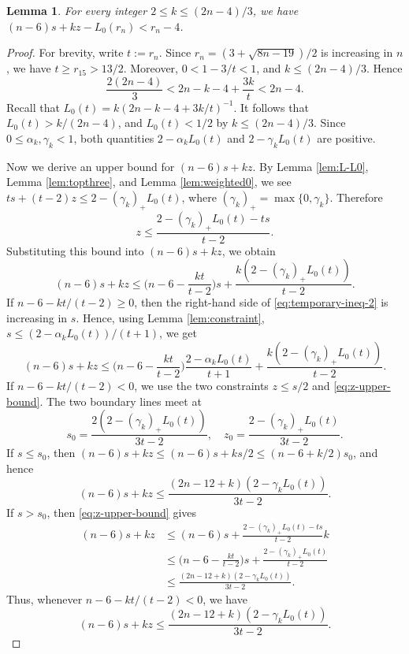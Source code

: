 \documentclass[11pt]{article}
\theoremstyle{plain}
\newtheorem{lemma}{Lemma}[section]
\theoremstyle{definition}
\numberwithin{equation}{section}
\begin{document}
\begin{lemma}\label{lem:normalized-first}
For every integer $2\leq k\le(2n-4)/3$, 
we have $(n-6)s + kz - L_0(r_n) < r_n - 4$.
\end{lemma}

\begin{proof}
For brevity, write $t := r_n$. Since
$r_n=(3+\sqrt{8n-19})/2$ is increasing in $n$, we have $t\geq r_{15} > 13/2$.
Moreover, $0<1-3/t<1$, and $k\leq (2n-4)/3$. Hence
\[
 \frac{2(2n-4)}3 < 2n-k-4+\frac{3k}{t} < 2n-4.
\]
Recall that $L_0(t) = k(2n - k - 4 + 3k/t)^{-1}$. It follows that
$L_0(t) > k/(2n-4)$, and $L_0(t) < 1/2$ by $k\leq (2n-4)/3$.
Since $0\leq\alpha_k, \gamma_k<1$, both quantities
$2-\alpha_kL_0(t)$ and $2-\gamma_kL_0(t)$ are positive.

Now we derive an upper bound for $(n-6)s + kz$. By Lemma \ref{lem:L-L0}, Lemma \ref{lem:topthree}, 
and Lemma \ref{lem:weighted0}, we see $ts + (t-2)z\leq 2 - (\gamma_k)_+ L_0(t)$, 
where $(\gamma_k)_+ = \max\{0, \gamma_k\}$. Therefore
\begin{equation}\label{eq:z-upper-bound}
 z\leq\frac{2 - (\gamma_k)_+ L_0(t) - ts}{t - 2}.
\end{equation}
Substituting this bound into $(n-6)s+kz$, we obtain
\begin{equation}\label{eq:temporary-ineq-2}
(n - 6) s + kz
\leq \Big(n - 6 - \frac{kt}{t-2}\Big)s + \frac{k(2 - (\gamma_k)_+ L_0(t))}{t - 2}.
\end{equation}
If $n - 6 - kt/(t-2)\geq 0$, then the right-hand side of \eqref{eq:temporary-ineq-2} is 
increasing in $s$. Hence, using Lemma \ref{lem:constraint}, $s\leq (2-\alpha_k L_0(t))/(t+1)$, we get
\begin{equation}\label{eq:temporary-ineq-(n-6)s}
(n-6)s + kz\leq \Big(n - 6 - \frac{kt}{t-2}\Big)
\frac{2 - \alpha_kL_0(t)}{t+1} + \frac{k(2 - (\gamma_k)_+ L_0(t))}{t-2}.
\end{equation}
If $n - 6 - kt/(t-2) < 0$, we use the two constraints $z\leq s/2$ and \eqref{eq:z-upper-bound}. 
The two boundary lines meet at
\[
 s_0 = \frac{2(2 - (\gamma_k)_+ L_0(t))}{3t-2}, \quad
 z_0 = \frac{2 - (\gamma_k)_+ L_0(t)}{3t - 2}.
\]
If $s \leq s_0$, then $(n-6)s + kz \leq (n-6)s + ks/2 \leq (n - 6 + k/2) s_0$, and hence
\[
(n-6)s + kz \leq \frac{(2n-12+k) (2 - \gamma_kL_0(t))}{3t-2}.
\]
If $s > s_0$, then \eqref{eq:z-upper-bound} gives
\begin{align*}
(n-6)s + kz 
& \leq (n-6)s + \frac{2 - (\gamma_k)_+ L_0(t) - ts}{t-2} k \\
& \leq \Big(n - 6 - \frac{kt}{t-2}\Big) s + \frac{2 - (\gamma_k)_+ L_0(t)}{t - 2} \\
& \leq \frac{(2n-12+k) (2 - \gamma_kL_0(t))}{3t-2}.
\end{align*}
Thus, whenever $n-6-kt/(t-2) < 0$, we have
\begin{equation}\label{eq:temporary-ineq-3}
(n - 6)s + kz\leq\frac{(2n-12+k) (2 - \gamma_kL_0(t))}{3t-2}.
\end{equation}


\end{proof}
\end{document}
